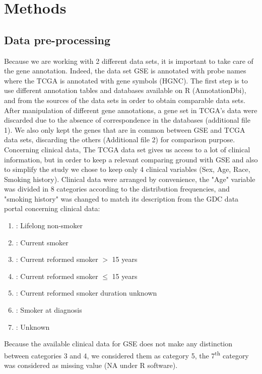 \documentclass[twocolumn]{article}
\begin{document}
\section{Methods}
\subsection{Data pre-processing}\label{sec:preprocess}

Because we are working with 2 different data sets, it is important to take care of the gene annotation. Indeed, the data set GSE\cite{shedden} is annotated with probe names where the TCGA\cite{TCGA} is annotated with gene symbols (HGNC).
The first step is to use different annotation tables and databases available on R (AnnotationDbi)\cite{annot}, and from the sources of the data sets in order to obtain comparable data sets.
After manipulation of different gene annotations, a gene set in TCGA's data were discarded due to the absence of correspondence in the databases (additional file 1). We also only kept the genes that are in common between GSE and TCGA data sets, discarding the others (Additional file 2) for comparison purpose.
Concerning clinical data, The TCGA data set gives us access to a lot of clinical information, but in order to keep a relevant comparing ground with GSE and also to simplify the study we chose to keep only 4 clinical variables (Sex, Age, Race, Smoking history).
Clinical data were arranged by convenience, the "Age" variable was divided in 8 categories according to the distribution frequencies, and "smoking history" was changed to match its description from the GDC data portal concerning clinical data:
\begin{enumerate}
    \item : Lifelong non-smoker
    \item : Current smoker
    \item : Current reformed smoker $>$ 15 years
    \item : Current reformed smoker $\leq$ 15 years
    \item : Current reformed smoker duration unknown
    \item : Smoker at diagnosis
    \item : Unknown
\end{enumerate}

Because the available clinical data for GSE does not make any distinction between categories 3 and 4, we considered them as category 5, the 7\textsuperscript{th} category was considered as missing value (NA under R software).
\end{document}
